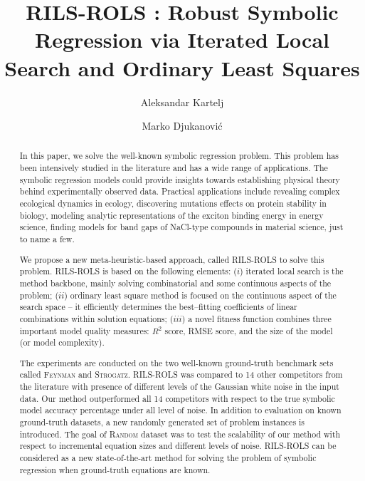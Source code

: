 \documentclass[a4paper,12pt]{elsarticle}
\begin{document}
	
	
	\title{\textsc{RILS}-\textsc{ROLS} : Robust Symbolic Regression via Iterated Local Search and Ordinary Least Squares}
	
	\author[1]{Aleksandar Kartelj}
	\author[2]{Marko Djukanovi\'c}
	\address[1]{$kartelj@matf.bg.ac.rs$, \\  Faculty of Mathematics, University of Belgrade, Serbia}
	\address[2]{$ marko.djukanovic@pmf.unibl.org$,\\   Faculty of Natural Sciences and Mathematics, University of Banja Luka, Bosnia and Herzegovina}
	\begin{abstract}
		In this paper, we solve the well-known symbolic regression problem. This problem has been intensively studied in the literature and has a wide range of applications. The symbolic regression models could provide insights towards establishing physical theory behind experimentally observed data. Practical applications include revealing complex ecological dynamics in ecology, discovering mutations effects on protein stability in biology, modeling analytic representations of the exciton binding energy in energy science, finding models for band gaps of NaCl-type compounds
		in material science, just to name a few. 
		
		We propose a new meta-heuristic-based approach, called \textsc{RILS}-\textsc{ROLS} to solve this problem. \textsc{RILS}-\textsc{ROLS} is based on the following elements: ($i$) iterated local search is the method backbone, mainly solving combinatorial and some continuous aspects of the problem; ($ii$) ordinary least square method is focused on the continuous aspect of the search space -- it efficiently determines the best--fitting coefficients of linear combinations within solution equations;  ($iii$) a novel fitness function combines three important model quality measures: $R^2$ score, RMSE score, and the size of the model (or model complexity). 
		
		The experiments are conducted on the two well-known ground-truth benchmark sets called \textsc{Feynman} and \textsc{Strogatz}. \textsc{RILS}-\textsc{ROLS} was compared to 14 other competitors from the literature with  presence of different levels of the Gaussian white noise in the input data. Our method outperformed all 14 competitors with respect to the true symbolic model accuracy percentage under all level of noise. 
		In addition to evaluation on known ground-truth datasets, a new randomly generated set of problem instances is introduced. The goal of \textsc{Random} dataset was to test the scalability of our method with respect to incremental equation sizes and different levels of noise. \textsc{RILS}-\textsc{ROLS} can be considered as a new state-of-the-art method for solving the problem of symbolic regression when ground-truth equations are known.
	\end{abstract}
	\maketitle
	
\end{document}
